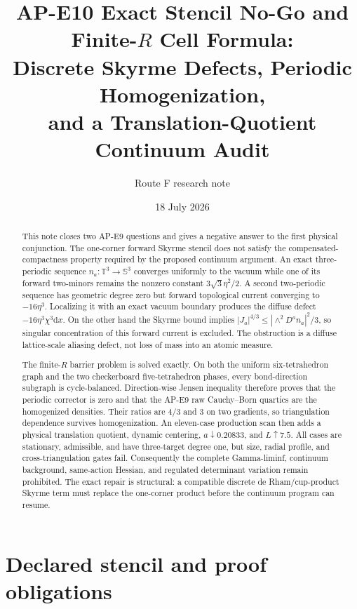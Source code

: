 \documentclass[11pt]{article}
\title{AP-E10 Exact Stencil No-Go and Finite-$R$ Cell Formula:\\
Discrete Skyrme Defects, Periodic Homogenization,\\
and a Translation-Quotient Continuum Audit}
\author{Route F research note}
\date{18 July 2026}
\numberwithin{equation}{section}
\theoremstyle{definition}
\theoremstyle{remark}
\newcommand{\TT}{\mathbb T}
\newcommand{\SSS}{\mathbb S}
\newcommand{\dd}{\mathrm d}
\begin{document}
\maketitle

\begin{abstract}
This note closes two AP-E9 questions and gives a negative answer to the first
physical conjunction.  The one-corner forward Skyrme stencil does not satisfy
the compensated-compactness property required by the proposed continuum
argument.  An exact three-periodic sequence $n_a:\TT^3\to\SSS^3$ converges
uniformly to the vacuum while one of its forward two-minors remains the
nonzero constant $3\sqrt3\eta^2/2$.  A second two-periodic sequence has
geometric degree zero but forward topological current converging to
$-16\eta^3$.  Localizing it with an exact vacuum boundary produces the diffuse
defect $-16\eta^3\chi^3\dd x$.  On the other hand the Skyrme bound implies
$|J_a|^{4/3}\le |\wedge^2D^an_a|^2/3$, so singular concentration of this
forward current is excluded.  The obstruction is a diffuse lattice-scale
aliasing defect, not loss of mass into an atomic measure.

The finite-$R$ barrier problem is solved exactly.  On both the uniform
six-tetrahedron graph and the two checkerboard five-tetrahedron phases, every
bond-direction subgraph is cycle-balanced.  Direction-wise Jensen inequality
therefore proves that the periodic corrector is zero and that the AP-E9 raw
Cauchy--Born quartics are the homogenized densities.  Their ratios are $4/3$
and $3$ on two gradients, so triangulation dependence survives homogenization.
An eleven-case production scan then adds a physical translation quotient,
dynamic centering, $a\downarrow0.20833$, and $L\uparrow7.5$.  All cases are
stationary, admissible, and have three-target degree one, but size, radial
profile, and cross-triangulation gates fail.  Consequently the complete
Gamma-liminf, continuum background, same-action Hessian, and regulated
determinant variation remain prohibited.  The exact repair is structural: a
compatible discrete de Rham/cup-product Skyrme term must replace the
one-corner product before the continuum program can resume.
\end{abstract}

\tableofcontents

\section{Declared stencil and proof obligations}
\end{document}
